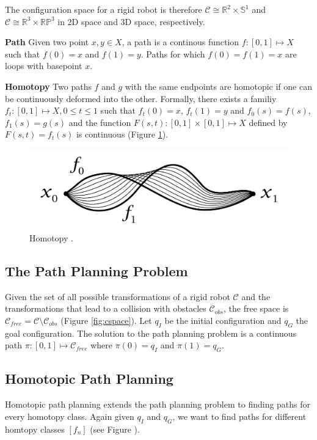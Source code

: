 \message{ !name(proposal.tex)}\documentclass[11pt,twocolumn]{article}
\begin{document}
The configuration space for a rigid robot is therefore \(\mathcal{C}
\cong \mathbb{R}^{2} \times \mathbb{S}^{1}\) and \(\mathcal{C} \cong
\mathbb{R}^{3} \times \mathbb{RP}^{3}\) in 2D space and 3D space,
respectively.

\textbf{Path} Given two point \(x, y \in X\), a path is a continous
function \(f: [0, 1] \mapsto X\) such that \(f(0) = x\) and \(f(1) =
y\). Paths for which \(f(0) = f(1) = x\) are loops with basepoint
\(x\).

\textbf{Homotopy} Two paths \(f\) and \(g\) with the same endpoints
are homotopic if one can be continuously deformed into the
other. Formally, there exists a familiy \(f_{t}: [0, 1] \mapsto X, 0
\le t \le 1\) such that \(f_{t}(0) = x\), \(f_{t}(1) = y\) and
\(f_{0}(s) = f(s)\), \(f_{1}(s) = g(s)\) and the function \(F(s, t):
[0, 1] \times [0, 1] \mapsto X\) defined by \(F(s, t) = f_{t}(s)\) is
continuous (Figure \ref{fig:homotopy}).

\begin{figure}[h] \centering \includegraphics[scale=.18]{homotopy}
  \caption{Homotopy \cite{hatcherAlgebraicTopology2002}.}
  \label{fig:homotopy}
\end{figure}

\subsection*{The Path Planning Problem} Given the set of all possible
transformations of a rigid robot \(\mathcal{C}\) and the
transformations that lead to a collision with obstacles
\(\mathcal{C}_{obs}\), the free space is \(\mathcal{C}_{free} =
\mathcal{C} \setminus \mathcal{C}_{obs}\) (Figure
\ref{fig:cspace}). Let \(q_I\) be the initial configuration and
\(q_G\) the goal configuration. The solution to the path planning
problem is a continuous path \(\pi: [0, 1] \mapsto
\mathcal{C}_{free}\) where \(\pi(0) = q_I\) and \(\pi(1) = q_G\).

\subsection*{Homotopic Path Planning} Homotopic path planning extends
the path planning problem to finding paths for every homotopy
class. Again given \(q_{I}\) and \(q_{G}\), we want to find paths for
different homtopy classes \([f_{n}]\) (see Figure ).
\end{document}
